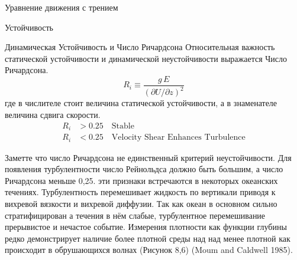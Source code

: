 \begin{chapter}{Уравнение движения с трением}
\begin{section}{Устойчивость}
\begin{paragraph}{Динамическая Устойчивость и Число Ричардсона}
Относительная важность статической устойчивости и динамической
неустойчивости выражается Число Ричардсона.
\begin{equation}
\boxed{R_i\equiv\frac{g\,E}{(\partial{U}/\partial{z})^2} }
\end{equation}
где в числителе стоит величина статической устойчивости, а в
знаменателе величина сдвига скорости.
\begin{align*}
R_i &>0.25 \quad \text{Stable} \\
R_i &<0.25 \quad \text{Velocity Shear Enhances Turbulence} 
\end{align*}
%

Заметте что число Ричардсона не единственный критерий
неустойчивости. Для появления турбулентности число Рейнольдса должно
быть большим, а число Ричардсона меньше 0,25. эти признаки встречаются
в некоторых океанских течениях. Турбулентность перемешивает жидкость
по вертикали приводя к вихревой вязкости и вихревой диффузии. Так как
океан в основном сильно стратифицирован а течения в нём слабые,
турбулентное перемешивание прерывистое и нечастое событие. Измерения
плотности как функции глубины редко демонстрирует наличие более
плотной среды над над менее плотной как происходит в обрушающихся
волнах (Рисунок 8,6) (Moum and Caldwell 1985).
%
\end{paragraph}


\end{section}
\end{chapter}
